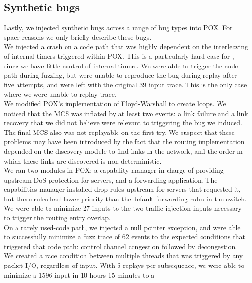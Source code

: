 \subsection{Synthetic bugs}
Lastly, we injected synthetic bugs across a range of bug types into POX. For space
reasons we only briefly describe these bugs.\\[0.5ex]
%
We injected a crash on a code path that was highly dependent on the
interleaving of internal timers triggered within POX. This is a particularly
hard case for \projectname, since we have little control of internal timers.
We were able to trigger the code path during fuzzing, but were unable to
reproduce the bug during replay after five attempts, and were left with the
original 39 input trace. This is the only case where we were
unable to replay trace.\\[0.5ex]
%
We modified POX's implementation of Floyd-Warshall to create loops.
We noticed that the MCS was inflated by at least two events: a link failure
and a link recovery that we did not believe were relevant to triggering the bug we
induced. The final MCS also was not replayable on the first try.
We suspect that these problems may have been introduced by the fact that the
routing implementation depended on the discovery module to find links in the
network, and the order in which these links are discovered is
non-deterministic.\\[0.5ex]
%
We ran two modules in POX: a capability manager in charge of providing
upstream DoS protection for servers, and a forwarding application. The
capabilities manager installed drop rules upstream for servers that requested
it, but these rules had lower priority than the default forwarding rules in
the switch. We were able to minimize 27 inputs to the two traffic injection
inputs necessary to trigger the routing entry overlap.\\[0.5ex]
%
On a rarely used-code path, we injected a null pointer exception,
and were able to successfully minimize a fuzz trace of 62 events to the
expected conditions that triggered that code path: control channel congestion followed
by decongestion.\\[0.5ex]
%
We created a race condition between multiple threads that was
triggered by any packet I/O, regardless of input. With 5 replays per
subsequence, we were able to minimize a 1596 input in 10 hours 15 minutes to a
